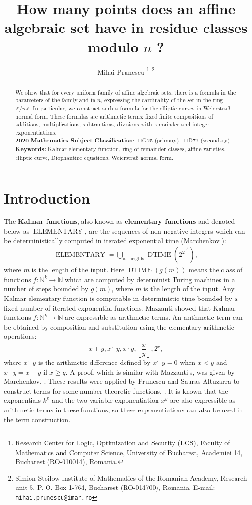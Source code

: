 \documentclass[10pt,a4paper]{article}
\title{How many points does an affine algebraic set have in residue classes modulo $n$ ?}
\author{Mihai Prunescu \footnote{Research Center for Logic, Optimization and Security (LOS), Faculty of Mathematics and Computer Science, University of Bucharest, Academiei 14, Bucharest (RO-010014), Romania.} \footnote{ Simion Stoilow Institute of Mathematics of the Romanian Academy, Research unit 5, P. O. Box 1-764, Bucharest (RO-014700), Romania. E-mail: {\tt mihai.prunescu@imar.ro}} 
}
\theoremstyle{plain}
\DeclareMathOperator{\DTIME}{DTIME}
\DeclareMathOperator{\ELEMENTARY}{ELEMENTARY}
\begin{document}
\date{}
\maketitle

\begin{abstract} \noindent
We show that for every uniform family of affine algebraic sets, there is a formula in the parameters of the family and in $n$, expressing the cardinality of the set in the ring  $\mathbb Z / n \mathbb Z$. In particular, we construct such a formula for the elliptic curves in Weierstra{\ss }  normal form.  These formulas are arithmetic terms: fixed finite compositions of additions, multiplications, subtractions, divisions with remainder and integer exponentiations.
\\[2mm]
{\bf 2020 Mathematics Subject Classification:} 11G25 (primary), 11D72 (secondary). \\[2mm]
{\bf Keywords:} Kalmar elementary function, ring of remainder classes, affine varieties, elliptic curve, Diophantine equations, Weierstra{\ss } normal form.
\end{abstract}

\section{Introduction}
The \textbf{Kalmar functions}, also known as \textbf{elementary functions} and denoted below as $\ELEMENTARY$, are the sequences of non-negative integers which can be deterministically computed in iterated exponential time (Marchenkov \cite[Introduction]{marchenkov2007superposition}):
\begin{align*}
\ELEMENTARY =  \bigcup_{\textrm{all heights}}\DTIME\left (2^{2^{\cdot^{\cdot^{\cdot^{\cdot ^{2^{2^m}}}}}}} \right ) ,
\end{align*}
where $m$ is the length of the input. Here $\DTIME(g(m))$ means the class of functions $f:\mathbb N^k \rightarrow \mathbb N$ which are computed by determinist Turing machines in a number of steps bounded by $g(m)$, where $m$ is the length of the input. Any Kalmar elementary function is computable in deterministic time bounded by a fixed number of iterated exponential functions. Mazzanti \cite{mazzanti2002plainbases} showed that Kalmar functions $f : \mathbb N^k \rightarrow \mathbb N$ are expressible as arithmetic terms. An arithmetic term can be obtained by composition and substitution using the elementary arithmetic operations:
$$x + y, x \dot{-} y, x \cdot y, \left \lfloor \frac{x}{y} \right \rfloor, 2^x,$$
where $x\dot{-}y$ is the arithmetic difference defined by $x \dot{-} y = 0$ when $x < y$ and $x \dot{-}y = x - y$ if $x \geq y$.  A proof, which is similar with Mazzanti's, was given by Marchenkov, \cite{marchenkov2007superposition}. These results were applied by Prunescu and Sauras-Altuzarra to construct terms for some number-theoretic functions, \cite{prunescu2024numbertheoreticfunctions}. It is known that the exponentials $k^x$ and the two-variable exponentiation $x^y$ are also expressible as arithmetic terms in these functions, so these exponentiations can also be used in the term construction.
\end{document}
